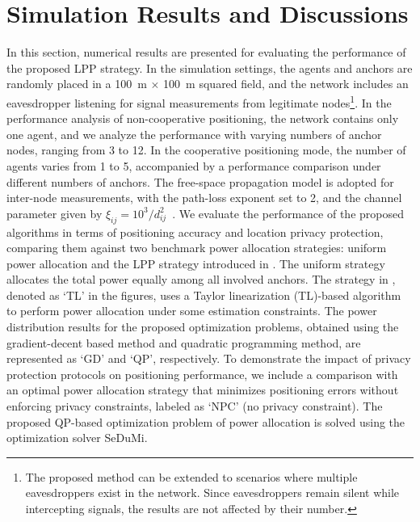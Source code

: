 \section{Simulation Results and Discussions}
In this section, numerical results are presented for evaluating the performance of the proposed LPP strategy. In the simulation settings, the agents and anchors are randomly placed in a 100~m $\times$ 100~m squared field, and the network includes an eavesdropper listening for signal measurements from legitimate nodes\footnote{The proposed method can be extended to scenarios where multiple eavesdroppers exist in the network. Since eavesdroppers remain silent while intercepting signals, the results are not affected by their number.}. In the performance analysis of non-cooperative positioning, the network contains only one agent, and we analyze the performance with varying numbers of anchor nodes, ranging from 3 to 12. In the cooperative positioning mode, the number of agents varies from 1 to 5, accompanied by a performance comparison under different numbers of anchors. The free-space propagation model is adopted for inter-node measurements, with the path-loss exponent set to 2, and the channel parameter given by $\xi_{ij}=10^3/d_{ij}^2$~\cite{2018proc-Win}. We evaluate the performance of the proposed algorithms in terms of positioning accuracy and location privacy protection, comparing them against two benchmark power allocation strategies: uniform power allocation and the LPP strategy introduced in \cite{2019TC-Zhang}. The uniform strategy allocates the total power equally among all involved anchors. The strategy in \cite{2019TC-Zhang}, denoted as `TL' in the figures,  uses a Taylor linearization (TL)-based algorithm to perform power allocation under some estimation constraints. The power distribution results for the proposed optimization problems, obtained using the gradient-decent based method and quadratic programming method, are represented as `GD' and `QP', respectively. To demonstrate the impact of privacy protection protocols on positioning performance, we include a comparison with an optimal power allocation strategy that minimizes positioning errors without enforcing privacy constraints, labeled as `NPC' (no privacy constraint). The proposed QP-based optimization problem of power allocation is solved using the optimization solver SeDuMi\cite{sedumi}.

